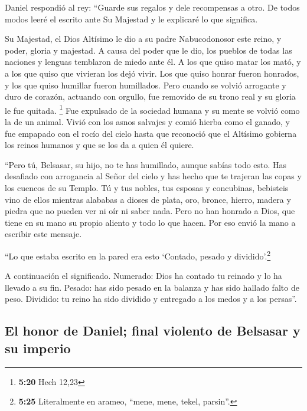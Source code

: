  Daniel respondió al rey: ``Guarde sus regalos y dele
recompensas a otro. De todos modos leeré el escrito ante Su Majestad y
le explicaré lo que significa.

 Su Majestad, el Dios Altísimo le dio a su padre
Nabucodonosor este reino, y poder, gloria y majestad.  A
causa del poder que le dio, los pueblos de todas las naciones y lenguas
temblaron de miedo ante él. A los que quiso matar los mató, y a los que
quiso que vivieran los dejó vivir. Los que quiso honrar fueron honrados,
y los que quiso humillar fueron humillados.  Pero cuando
se volvió arrogante y duro de corazón, actuando con orgullo, fue
removido de su trono real y su gloria le fue quitada. \footnote{\textbf{5:20}
  Hech 12,23}  Fue expulsado de la sociedad humana y su
mente se volvió como la de un animal. Vivió con los asnos salvajes y
comió hierba como el ganado, y fue empapado con el rocío del cielo hasta
que reconoció que el Altísimo gobierna los reinos humanos y que se los
da a quien él quiere.

 ``Pero tú, Belsasar, su hijo, no te has humillado,
aunque sabías todo esto.  Has desafiado con arrogancia al
Señor del cielo y has hecho que te trajeran las copas y los cuencos de
su Templo. Tú y tus nobles, tus esposas y concubinas, bebisteis vino de
ellos mientras alababas a dioses de plata, oro, bronce, hierro, madera y
piedra que no pueden ver ni oír ni saber nada. Pero no han honrado a
Dios, que tiene en su mano su propio aliento y todo lo que hacen.
 Por eso envió la mano a escribir este mensaje.

 ``Lo que estaba escrito en la pared era esto `Contado,
pesado y dividido'.\footnote{\textbf{5:25} Literalmente en arameo,
  ``mene, mene, tekel, parsin''.}

 A continuación el significado. Numerado: Dios ha contado
tu reinado y lo ha llevado a su fin.  Pesado: has sido
pesado en la balanza y has sido hallado falto de peso. 
Dividido: tu reino ha sido dividido y entregado a los medos y a los
persas''.

\hypertarget{el-honor-de-daniel-final-violento-de-belsasar-y-su-imperio}{%
\subsection{El honor de Daniel; final violento de Belsasar y su
imperio}\label{el-honor-de-daniel-final-violento-de-belsasar-y-su-imperio}}


